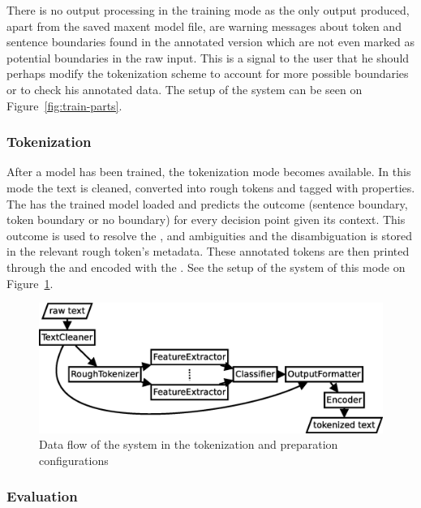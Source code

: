 There is no output processing in the training mode as the only output produced,
apart from the saved maxent model file, are warning messages about token and
sentence boundaries found in the annotated version which are not even marked as
potential boundaries in the raw input. This is a signal to the user that he
should perhaps modify the tokenization scheme to account for more possible
boundaries or to check his annotated data. The setup of the system can be seen
on Figure~\ref{fig:train-parts}.

\subsubsection{Tokenization}
\label{ssec:impl-modes-tokenize}

After a model has been trained, the tokenization mode becomes available. In
this mode the text is cleaned, converted into rough tokens and tagged with
properties. The  has the trained model loaded and predicts
the outcome (sentence boundary, token boundary or no boundary) for every
decision point given its context. This outcome is used to resolve the
\maysplit{}, \mayjoin{} and \maybreaksentence{} ambiguities and the
disambiguation is stored in the relevant rough token's metadata. These
annotated tokens are then printed through the  and
encoded with the . See the setup of the system of this mode on
Figure~\ref{fig:tokenize-parts}.

\begin{figure}
  \begin{center}
    \includegraphics[width=\textwidth]{img/tokenize-parts.eps}
    \caption{Data flow of the system in the tokenization and preparation
             configurations}
    \label{fig:tokenize-parts}
  \end{center}
\end{figure}

\subsubsection{Evaluation}
\label{ssec:impl-modes-evaluate}

